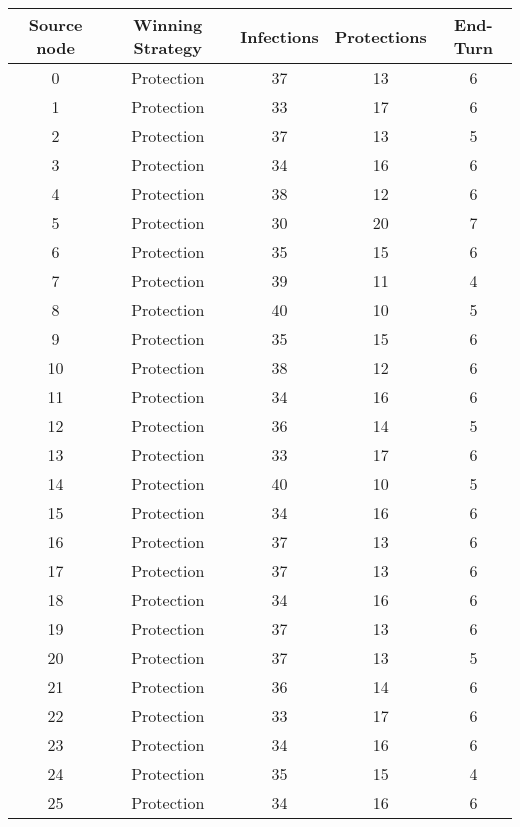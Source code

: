 \documentclass[results.tex]{subfiles}
\begin{document}
\begin{center}
  \begin{tabular}{| c || c | c | c | c |}
    \hline
    {\bfseries Source node} & {\bfseries Winning Strategy} & {\bfseries Infections} & {\bfseries Protections} & {\bfseries End-Turn} \\  %
    \hline\hline
    0 & Protection & 37 & 13 & 6 \\ 
    \hline
    1 & Protection & 33 & 17 & 6 \\ 
    \hline
    2 & Protection & 37 & 13 & 5 \\ 
    \hline
    3 & Protection & 34 & 16 & 6 \\ 
    \hline
    4 & Protection & 38 & 12 & 6 \\ 
    \hline
    5 & Protection & 30 & 20 & 7 \\ 
    \hline
    6 & Protection & 35 & 15 & 6 \\ 
    \hline
    7 & Protection & 39 & 11 & 4 \\ 
    \hline
    8 & Protection & 40 & 10 & 5 \\ 
    \hline
    9 & Protection & 35 & 15 & 6 \\ 
    \hline
    10 & Protection & 38 & 12 & 6 \\ 
    \hline
    11 & Protection & 34 & 16 & 6 \\ 
    \hline
    12 & Protection & 36 & 14 & 5 \\ 
    \hline
    13 & Protection & 33 & 17 & 6 \\ 
    \hline
    14 & Protection & 40 & 10 & 5 \\ 
    \hline
    15 & Protection & 34 & 16 & 6 \\ 
    \hline
    16 & Protection & 37 & 13 & 6 \\ 
    \hline
    17 & Protection & 37 & 13 & 6 \\ 
    \hline
    18 & Protection & 34 & 16 & 6 \\ 
    \hline
    19 & Protection & 37 & 13 & 6 \\ 
    \hline
    20 & Protection & 37 & 13 & 5 \\ 
    \hline
    21 & Protection & 36 & 14 & 6 \\ 
    \hline
    22 & Protection & 33 & 17 & 6 \\ 
    \hline
    23 & Protection & 34 & 16 & 6 \\ 
    \hline
    24 & Protection & 35 & 15 & 4 \\ 
    \hline
    25 & Protection & 34 & 16 & 6 \\ 

\end{tabular}
\end{center}
\end{document}
